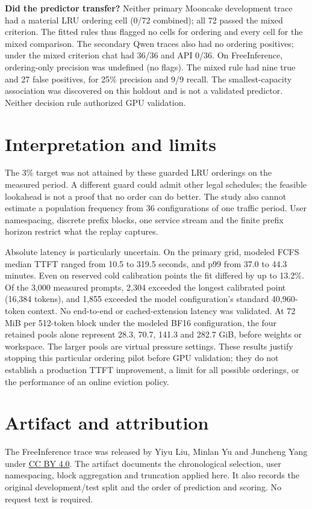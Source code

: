 \documentclass[11pt,letterpaper]{article}
\begin{document}
\textbf{Did the predictor transfer?} Neither primary Mooncake development trace had a material LRU ordering cell (0/72 combined); all 72 passed the mixed criterion. The fitted rules thus flagged no cells for ordering and every cell for the mixed comparison. The secondary Qwen traces also had no ordering positives; under the mixed criterion chat had 36/36 and API 0/36. On FreeInference, ordering-only precision was undefined (no flags). The mixed rule had nine true and 27 false positives, for 25\% precision and 9/9 recall. The smallest-capacity association was discovered on this holdout and is not a validated predictor. Neither decision rule authorized GPU validation.

\section{Interpretation and limits}
The 3\% target was not attained by these guarded LRU orderings on the measured period. A different guard could admit other legal schedules; the feasible lookahead is not a proof that no order can do better. The study also cannot estimate a population frequency from 36 configurations of one traffic period. User namespacing, discrete prefix blocks, one service stream and the finite prefix horizon restrict what the replay captures.

Absolute latency is particularly uncertain. On the primary grid, modeled FCFS median TTFT ranged from 10.5 to 319.5 seconds, and p99 from 37.0 to 44.3 minutes. Even on reserved cold calibration points the fit differed by up to 13.2\%. Of the 3,000 measured prompts, 2,304 exceeded the longest calibrated point (16,384 tokens), and 1,855 exceeded the model configuration's standard 40,960-token context. No end-to-end or cached-extension latency was validated. At 72 MiB per 512-token block under the modeled BF16 configuration, the four retained pools alone represent 28.3, 70.7, 141.3 and 282.7 GiB, before weights or workspace. The larger pools are virtual pressure settings. These results justify stopping this particular ordering pilot before GPU validation; they do not establish a production TTFT improvement, a limit for all possible orderings, or the performance of an online eviction policy.

\section*{Artifact and attribution}
The FreeInference trace was released by Yiyu Liu, Minlan Yu and Juncheng Yang under \href{https://creativecommons.org/licenses/by/4.0/}{CC BY 4.0}. The artifact documents the chronological selection, user namespacing, block aggregation and truncation applied here. It also records the original development/test split and the order of prediction and scoring. No request text is required.
\end{document}
